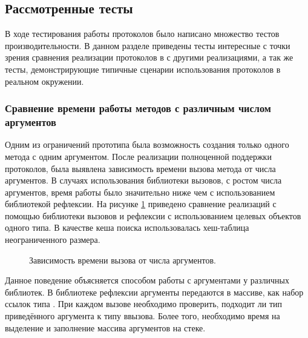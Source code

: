 \subsection{Рассмотренные тесты}
В ходе тестирования работы протоколов было написано множество тестов производительности. В данном разделе приведены тесты интересные с точки зрения сравнения реализации протоколов в  с другими реализациями, а так же тесты, демонстрирующие типичные сценарии использования протоколов в реальном окружении.

\subsubsection{Сравнение времени работы методов с различным числом аргументов}
Одним из ограничений прототипа была возможность создания только одного метода с одним аргументом. После реализации полноценной поддержки протоколов, была выявлена зависимость времени вызова метода от числа аргументов. В случаях использования библиотеки вызовов, с ростом числа аргументов, время работы было значительно ниже чем с использованием библиотекой рефлексии. На рисунке \ref{plot:bench:argsCount} приведено сравнение реализаций с помощью библиотеки вызовов и рефлексии с использованием целевых объектов одного типа. В качестве кеша поиска использовалась хеш-таблица неограниченного размера.

\begin{figure}
\caption{\label{plot:bench:argsCount}Зависимость времени вызова от числа аргументов.}
\end{figure}

Данное поведение объясняется способом работы с аргументами у различных библиотек. В библиотеке рефлексии аргументы передаются в массиве, как набор ссылок типа . При каждом вызове необходимо проверить, подходит ли тип приведённого аргумента к типу ввызова. Более того, необходимо время на выделение и заполнение массива аргументов на стеке.

